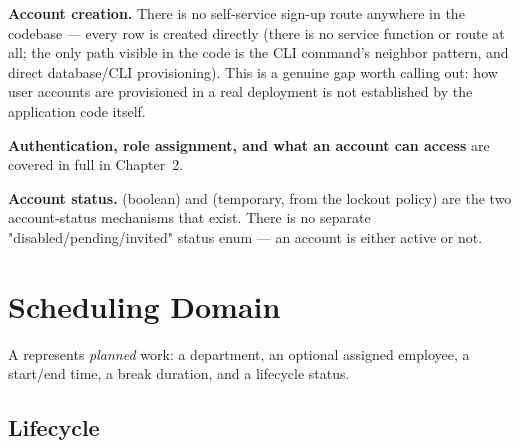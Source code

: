 \begin{center}
\end{center}

\textbf{Account creation.} There is no self-service sign-up route
anywhere in the codebase --- every  row is created directly
(there is no  service function or route at all; the
only path visible in the code is the 
CLI command's neighbor pattern, and direct database/CLI provisioning).
This is a genuine gap worth calling out: \VERIFY{} how user accounts
are provisioned in a real deployment is not established by the
application code itself.

\textbf{Authentication, role assignment, and what an account can
access} are covered in full in Chapter~2.

\textbf{Account status.}  (boolean) and
 (temporary, from the lockout policy) are the two
account-status mechanisms that exist. There is no separate
"disabled/pending/invited" status enum --- an account is either active
or not.

\section{Scheduling Domain}

A  represents \emph{planned} work: a department, an
optional assigned employee, a start/end time, a break duration, and a
lifecycle status.

\subsection*{Lifecycle}


